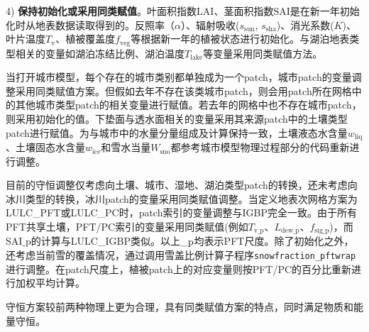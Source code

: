 4) \textbf{保持初始化或采用同类赋值}。叶面积指数LAI、茎面积指数${\mathrm {SAI}}$是在新一年初始化时从地表数据读取得到的。反照率（$\alpha$）、辐射吸收($s_{\mathrm {sun}}$, $s_{\mathrm {sha}}$)、消光系数($K$)、叶片温度$T_{\mathrm{v}}$、植被覆盖度$f_{\mathrm{veg}}$等根据新一年的植被状态进行初始化。与湖泊地表类型相关的变量如湖泊冻结比例、湖泊温度$T_{\mathrm{lake}}$等变量采用同类赋值方法。

当打开城市模型，每个存在的城市类别都单独成为一个patch，城市patch的变量调整采用同类赋值方案。但假如去年不存在该类城市patch，则会用patch所在网格中的其他城市类型patch的相关变量进行赋值。若去年的网格中也不存在城市patch，则采用初始化的值。下垫面与透水面相关的变量采用其来源patch中的土壤类型patch进行赋值。为与城市中的水量分量组成及计算保持一致，土壤液态水含量$w_{\mathrm{liq}}$、土壤固态水含量$w_{\mathrm{ice}}$和雪水当量$W_{\mathrm{sno}}$都参考城市模型物理过程部分的代码重新进行调整。

目前的守恒调整仅考虑向土壤、城市、湿地、湖泊类型patch的转换，还未考虑向冰川类型的转换，冰川patch的变量采用同类赋值调整。当定义地表次网格方案为LULC\_PFT或LULC\_PC时，patch索引的变量调整与IGBP完全一致。由于所有PFT共享土壤，PFT/PC索引的变量采用同类赋值(例如$T_{\mathrm{v\_p}}$、$L_{\mathrm{dew\_p}}$、$f_{\mathrm{sig\_p}}$)，而$\mathrm{SAI\_p}$的计算与LULC\_IGBP类似。以上$\_{\rm p}$均表示PFT尺度。除了初始化之外，还考虑当前雪的覆盖情况，通过调用雪盖比例计算子程序\texttt{snowfraction\_pftwrap}进行调整。在patch尺度上，植被patch上的对应变量则按PFT/PC的百分比重新进行加权平均计算。

守恒方案较前两种物理上更为合理，具有同类赋值方案的特点，同时满足物质和能量守恒。
